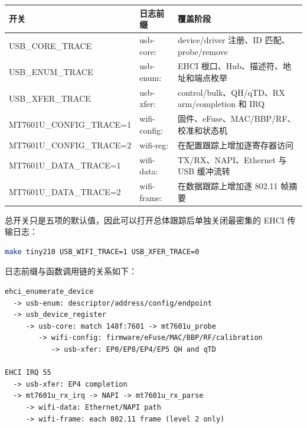 \begingroup\small
\begin{longtable}{p{35mm}p{24mm}p{73mm}}
\toprule
开关 & 日志前缀 & 覆盖阶段 \\ \midrule \endhead
{\ttfamily\scriptsize USB\_CORE\_TRACE} & {\ttfamily\scriptsize usb-core:} & device/driver 注册、ID 匹配、probe/remove \\
{\ttfamily\scriptsize USB\_ENUM\_TRACE} & {\ttfamily\scriptsize usb-enum:} & EHCI 根口、Hub、描述符、地址和端点枚举 \\
{\ttfamily\scriptsize USB\_XFER\_TRACE} & {\ttfamily\scriptsize usb-xfer:} & control/bulk、QH/qTD、RX arm/completion 和 IRQ \\
{\ttfamily\scriptsize MT7601U\_\allowbreak CONFIG\_\allowbreak TRACE=1} & {\ttfamily\scriptsize wifi-config:} & 固件、eFuse、MAC/BBP/RF、校准和状态机 \\
{\ttfamily\scriptsize MT7601U\_\allowbreak CONFIG\_\allowbreak TRACE=2} & {\ttfamily\scriptsize wifi-reg:} & 在配置跟踪上增加逐寄存器访问 \\
{\ttfamily\scriptsize MT7601U\_\allowbreak DATA\_\allowbreak TRACE=1} & {\ttfamily\scriptsize wifi-data:} & TX/RX、NAPI、Ethernet 与 USB 缓冲流转 \\
{\ttfamily\scriptsize MT7601U\_\allowbreak DATA\_\allowbreak TRACE=2} & {\ttfamily\scriptsize wifi-frame:} & 在数据跟踪上增加逐 802.11 帧摘要 \\
\bottomrule
\end{longtable}
\endgroup

总开关只是五项的默认值，因此可以打开总体跟踪后单独关闭最密集的 EHCI
传输日志：

\begin{lstlisting}[language=sh]
make tiny210 USB_WIFI_TRACE=1 USB_XFER_TRACE=0
\end{lstlisting}

日志前缀与函数调用链的关系如下：

\begin{lstlisting}
ehci_enumerate_device
  -> usb-enum: descriptor/address/config/endpoint
  -> usb_device_register
     -> usb-core: match 148f:7601 -> mt7601u_probe
        -> wifi-config: firmware/eFuse/MAC/BBP/RF/calibration
           -> usb-xfer: EP0/EP8/EP4/EP5 QH and qTD

EHCI IRQ 55
  -> usb-xfer: EP4 completion
  -> mt7601u_rx_irq -> NAPI -> mt7601u_rx_parse
     -> wifi-data: Ethernet/NAPI path
     -> wifi-frame: each 802.11 frame (level 2 only)
\end{lstlisting}


